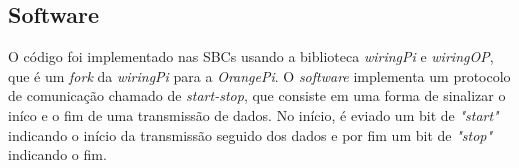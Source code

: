 \subsection{Software}

O código foi implementado nas SBCs usando a biblioteca \textit{wiringPi} e \textit{wiringOP}, que é um \textit{fork} da \textit{wiringPi} para a \textit{OrangePi}. O \textit{software} implementa um protocolo de comunicação chamado de \textit{start-stop}, que consiste em uma forma de sinalizar o iníco e o fim de uma transmissão de dados. No início, é eviado um bit de \textit{"start"} indicando o início da transmissão seguido dos dados e por fim um bit de \textit{"stop"} indicando o fim.

